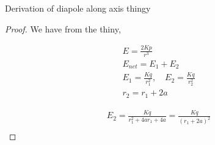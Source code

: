 \documentclass{article}
\begin{document}
\begin{section}{Derivation of diapole along axis thingy}

    \begin{proof}

        We have from the thiny, 

            \begin{align}
                E = \frac{2Kp}{r^3}\\
                E_{net} = E_1 + E_2 \\
                E_1 = \frac{Kq}{r_1^2}, \quad  E_2 = \frac{Kq}{r_2^2} \\
                r_2 = r_1 + 2a
            \end{align}

            \begin{align}
                E_2 = \frac{Kq}{r_1^2 + 4ar_1 + 4a} = \frac{Kq}{(r_1+2a)^2}\\  
            \end{align}

    \end{proof}
\end{section}
\end{document}
